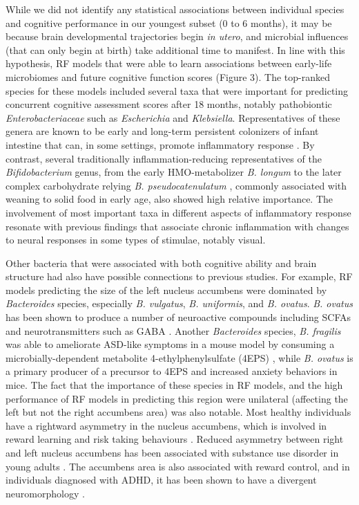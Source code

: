 \documentclass{article}
\begin{document}
While we did not identify any statistical associations between individual species
and cognitive performance in our youngest subset (0 to 6 months),
it may be because brain developmental trajectories begin \textit{in utero},
and microbial influences (that can only begin at birth)
take additional time to manifest.
In line with this hypothesis, RF models that were able to learn associations
between early-life microbiomes and future cognitive function scores (Figure 3).
The top-ranked species for these models included several 
taxa that were important for predicting concurrent cognitive assessment scores after 18 months, notably
pathobiontic \textit{Enterobacteriaceae} such as
\textit{Escherichia} and \textit{Klebsiella}. 
Representatives of these genera are known to be early and long-term persistent
colonizers of infant intestine that can, in some settings,
promote inflammatory response \cite{popeEnterobacEarlyGut2019}.
By contrast, several traditionally inflammation-reducing representatives
of the \textit{Bifidobacterium} genus,
from the early HMO-metabolizer \textit{B. longum} to the
later complex carbohydrate relying \textit{B. pseudocatenulatum} \cite{chungBifidoPsudocatenulatum2021},
commonly associated with weaning to solid food in early age,
also showed high relative importance.
The involvement of most important taxa in different aspects of inflammatory response
resonate with previous findings that associate chronic inflammation with
changes to neural responses in some types of stimulae, notably visual\cite{xieChronicInfNeuro2019}.

Other bacteria that were associated with both cognitive ability and
brain structure had also have possible connections to previous studies.
For example, RF models predicting the size of the left nucleus accumbens
were dominated by \textit{Bacteroides} species,
especially \textit{B. vulgatus}, \textit{B. uniformis}, and \textit{B. ovatus}.
\textit{B. ovatus} has been shown to produce
a number of neuroactive compounds including SCFAs and neurotransmitters
such as GABA \cite{horvathBacteroidesOvatusColonization2022}.
Another \textit{Bacteroides} species, \textit{B. fragilis} was
able to ameliorate ASD-like symptoms in a mouse model
by consuming a microbially-dependent metabolite 4-ethylphenylsulfate (4EPS)
\cite{hsiaoMicrobiotaModulateBehavioral2013},
while \textit{B. ovatus} is a primary producer of a precursor to 4EPS
\cite{needhamGutderivedMetaboliteAlters2022} and increased anxiety
behaviors in mice.
The fact that the importance of these species in RF models,
and the high performance of RF models in predicting this region
were unilateral (affecting the left but not the right accumbens area)
was also notable. Most healthy individuals have a
rightward asymmetry in the nucleus accumbens,
which is involved in reward learning and risk taking behaviours
\cite{ernstAmygdalaNucleusAccumbens2005,yauNucleusAccumbensResponse2012}.
Reduced asymmetry between right and left nucleus accumbens
has been associated with substance use disorder in young adults
\cite{caoMappingCorticalSubcortical2021}. The accumbens area is also
associated with reward control, and in individuals diagnosed with ADHD,
it has been shown to have a divergent neuromorphology
\cite{hoogmanSubcorticalBrainVolume2017}.
\end{document}
